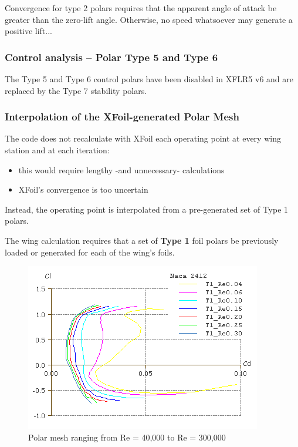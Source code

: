 \documentclass[a4paper,twoside,12pt,dvips]{article}
\begin{document}
Convergence for type 2 polars requires that the apparent angle of
attack be greater than the zero-lift angle. Otherwise, no speed
whatsoever may generate a positive lift...

\subsubsection{Control analysis -- Polar \foreignlanguage{english}{Type 5 and Type 6}}

The Type 5 and Type 6 control polars have been disabled in XFLR5 v6 and
are replaced by the Type 7 stability polars.

\subsubsection{Interpolation of the XFoil-generated Polar Mesh}

The code does not recalculate with XFoil each operating point at every
wing station and at each iteration: 

\begin{itemize}
\item this would require lengthy -and unnecessary- calculations
\item XFoil's convergence is too uncertain
\end{itemize}

Instead, the operating point is interpolated from a pre-generated set
of Type 1 polars.

The wing calculation requires that a set of \textbf{Type 1} foil
polars be previously loaded or generated for each of the wing's
foils.\newline

\begin{figure}[htbp]
  \includegraphics[width=0.8\linewidth]{img-35}\centering 
  \caption{Polar mesh ranging from Re = 40,000 to Re = 300,000}
  \label{fig:polar_mesh_ranging_from}
\end{figure}
\end{document}
